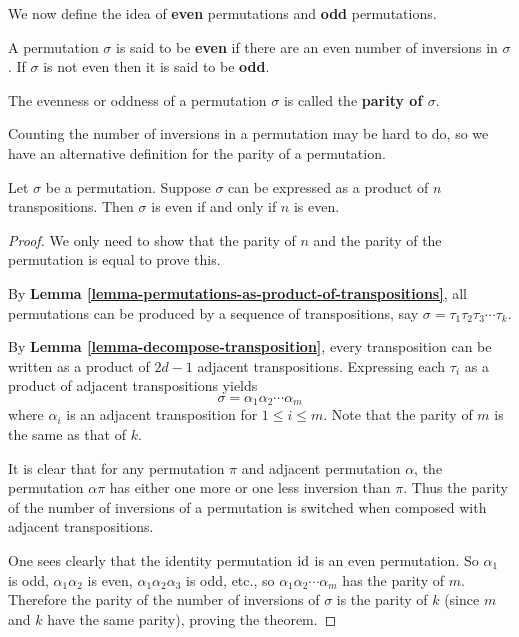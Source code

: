 We now define the idea of \textbf{even} permutations and \textbf{odd} permutations.
\begin{definition}
    A permutation $\sigma$ is said to be \textbf{even} if there are an even number of inversions in $\sigma$. If $\sigma$ is not even then it is said to be \textbf{odd}.
\end{definition}
The evenness or oddness of a permutation $\sigma$ is called the \textbf{parity of $\sigma$}.

Counting the number of inversions in a permutation may be hard to do, so we have an alternative definition for the parity of a permutation.

\begin{theorem}\label{thrm-parity-of-permutation}
    Let $\sigma$ be a permutation. Suppose $\sigma$ can be expressed as a product of $n$ transpositions. Then $\sigma$ is even if and only if $n$ is even.
\end{theorem}
\begin{proof}
    We only need to show that the parity of $n$ and the parity of the permutation is equal to prove this.

    By \textbf{Lemma \ref{lemma-permutations-as-product-of-transpositions}}, all permutations can be produced by a sequence of transpositions, say $\sigma = \tau_1\tau_2\tau_3\cdots\tau_k$.

    By \textbf{Lemma \ref{lemma-decompose-transposition}}, every transposition can be written as a product of $2d - 1$ adjacent transpositions. Expressing each $\tau_i$ as a product of adjacent transpositions yields
    \[
        \sigma = \alpha_1\alpha_2\cdots\alpha_m
    \]
    where $\alpha_i$ is an adjacent transposition for $1 \leq i \leq m$. Note that the parity of $m$ is the same as that of $k$.

    It is clear that for any permutation $\pi$ and adjacent permutation $\alpha$, the permutation $\alpha\pi$ has either one more or one less inversion than $\pi$. Thus the parity of the number of inversions of a permutation is switched when composed with adjacent transpositions.

    One sees clearly that the identity permutation $\mathrm{id}$ is an even permutation. So $\alpha_1$ is odd, $\alpha_1\alpha_2$ is even, $\alpha_1\alpha_2\alpha_3$ is odd, etc., so $\alpha_1\alpha_2\cdots\alpha_m$ has the parity of $m$. Therefore the parity of the number of inversions of $\sigma$ is the parity of $k$ (since $m$ and $k$ have the same parity), proving the theorem.
\end{proof}

